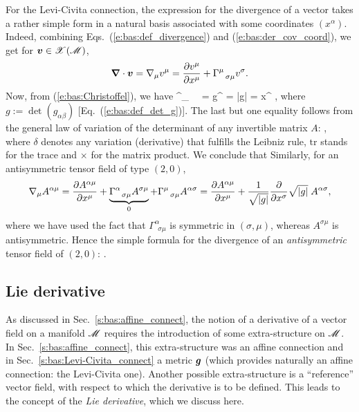 For the Levi-Civita connection, the expression for the divergence of a vector takes
a rather simple form in a natural basis associated with some coordinates $(x^\alpha)$.
Indeed, combining Eqs.~(\ref{e:bas:def_divergence}) and (\ref{e:bas:der_cov_coord}),
we get for $\bm{v}\in\mathscr{X}(\mathscr{M})$,
\[
  \bm{\nabla}\cdot\bm{v} = \nabla_\mu v^\mu = \frac{\partial v^\mu}{\partial x^\mu} + \Gamma^\mu_{\ \ \sigma\mu} v^\sigma   .
\]
Now, from (\ref{e:bas:Christoffel}),  we have
\be \label{e:bas:trGam_det_g}
  \Gamma^\mu_{\ \ \alpha\mu} =   g^{\mu\nu} 
  =   \ln|g|
  = \der{} {x^\alpha}  ,
\ee
where $g := \det(g_{\alpha\beta})$ [Eq.~(\ref{e:bas:def_det_g})].
The last but one equality follows from the general law of variation of the determinant of any
invertible matrix $A$:
\be \label{e:bas:variation_det}
	 ,
\ee
where $\delta$ denotes any variation (derivative) that fulfills the Leibniz rule,
$\mathrm{tr}$ stands for the trace and $\times$ for the matrix product.
We conclude that
\be \label{e:bas:div_vect}
\ee
Similarly, for an antisymmetric tensor field of type $(2,0)$,
\[
   \nabla_\mu A^{\alpha\mu}
  = \frac{\partial A^{\alpha\mu}}{\partial x^\mu} +
  \underbrace{\Gamma^\alpha_{\ \ \sigma\mu} A^{\sigma\mu}}_{0}
  + \Gamma^\mu_{\ \ \sigma\mu} A^{\alpha\sigma}
  = \frac{\partial A^{\alpha\mu}}{\partial x^\mu} +  \frac{1}{\sqrt{|g|}}\frac{\partial }{\partial x^\sigma} \sqrt{|g|}
  \;  A^{\alpha\sigma} ,
\]
where we have used the fact that $\Gamma^\alpha_{\ \ \sigma\mu}$ is symmetric in
$(\sigma,\mu)$, whereas $A^{\sigma\mu}$ is antisymmetric.
Hence the simple formula for the divergence of an \emph{antisymmetric} tensor field
of $(2,0)$:
\be \label{e:bas:div_antisym}
   .
\ee


\subsection{Lie derivative} \label{s:bas:Lie}

As discussed in Sec.~\ref{s:bas:affine_connect}, the notion of a derivative of a vector field on a manifold $\mathscr{M}$
requires the introduction of some extra-structure on $\mathscr{M}$.
In Sec.~\ref{s:bas:affine_connect}, this extra-structure was an affine connection
and in Sec.~\ref{s:bas:Levi-Civita_connect} a metric
$\bm{g}$ (which provides naturally an affine connection: the Levi-Civita one).
Another possible extra-structure is a ``reference''
vector field, with respect to which the derivative is to be defined. This leads to the
concept of the \emph{Lie derivative}, which we discuss here.


